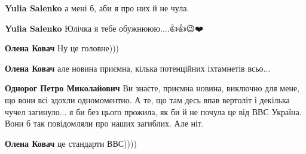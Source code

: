 \begin{itemize}
\begin{itemize}
\begin{itemize}
\textbf{Yulia Salenko} а мені б, аби я про них й не чула.

 
\textbf{Yulia Salenko} Юлічка я тебе обужнююю....👍👍😉❤️

 
\textbf{Олена Ковач} Ну це головне)))
\end{itemize}

 
\textbf{Олена Ковач} але новина приємна, кілька потенційних іхтамнетів всьо...

\begin{itemize}


\textbf{Однорог Петро Миколайович} Ви знаєте, приємна новина, виключно для
мене, що вони всі здохли одномоментно. А те, що там десь впав вертоліт і
декілька чучел загинуло... я би без цього прожила, як би й не почула це від ВВС
Україна. Вони б так повідомляли про наших загиблих. Але ніт.
\end{itemize}

 
\textbf{Олена Ковач} це стандарти ВВС))))

\begin{itemize}
 

\end{itemize}
\end{itemize}
\end{itemize}

